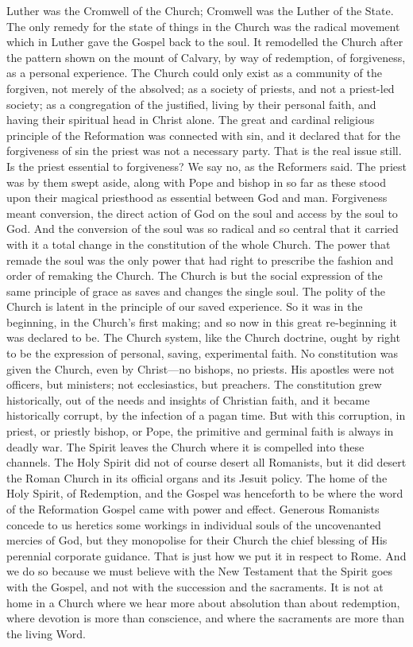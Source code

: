 \documentclass[12pt,a5paper,twoside]{book}
\begin{document}
Luther was the Cromwell of the Church; Cromwell 
was the Luther of the State. The only remedy 
for the state of things in the Church was the radical 
movement which in Luther gave the Gospel back to 
the soul. It remodelled the Church after the pattern 
shown on the mount of Calvary, by way of redemption, 
of forgiveness, as a personal experience. The 
Church could only exist as a community of the forgiven, 
not merely of the absolved; as a society of priests, 
and not a priest-led society; as a congregation of the 
justified, living by their personal faith, and having 
their spiritual head in Christ alone. The great and 
cardinal religious principle of the Reformation was 
connected with sin, and it declared that for the forgiveness 
of sin the priest was not a necessary party. 
That is the real issue still. Is the priest essential to 
forgiveness? We say no, as the Reformers said. 
The priest was by them swept aside, along with 
Pope and bishop in so far as these stood upon their 
magical priesthood as essential between God and man. 
Forgiveness meant conversion, the direct action of God 
on the soul and access by the soul to God. And 
the conversion of the soul was so radical and so 
central that it carried with it a total change in the 
constitution of the whole Church. The power that 
remade the soul was the only power that had right 
to prescribe the fashion and order of remaking the 
Church. The Church is but the social expression 
of the same principle of grace as saves and changes 
the single soul. The polity of the Church is latent 
in the principle of our saved experience. So it was 
in the beginning, in the Church's first making; and 
so now in this great re-beginning it was declared to 
be. The Church system, like the Church doctrine, 
ought by right to be the expression of personal, saving, 
experimental faith. No constitution was given the 
Church, even by Christ---no bishops, no priests. His 
apostles were not officers, but ministers; not ecclesiastics, 
but preachers. The constitution grew historically, 
out of the needs and insights of Christian 
faith, and it became historically corrupt, by the infection 
of a pagan time. But with this corruption, in priest, 
or priestly bishop, or Pope, the primitive and germinal 
faith is always in deadly war. The Spirit leaves the 
Church where it is compelled into these channels. 
The Holy Spirit did not of course desert all Romanists, 
but it did desert the Roman Church in its official 
organs and its Jesuit policy. The home of the Holy 
Spirit, of Redemption, and the Gospel was henceforth 
to be where the word of the Reformation Gospel came 
with power and effect. Generous Romanists concede 
to us heretics some workings in individual souls of the 
uncovenanted mercies of God, but they monopolise 
for their Church the chief blessing of His perennial 
corporate guidance. That is just how we put it in 
respect to Rome. And we do so because we must 
believe with the New Testament that the Spirit goes 
with the Gospel, and not with the succession and the 
sacraments. It is not at home in a Church where we 
hear more about absolution than about redemption, 
where devotion is more than conscience, and where 
the sacraments are more than the living Word. 
\end{document}
